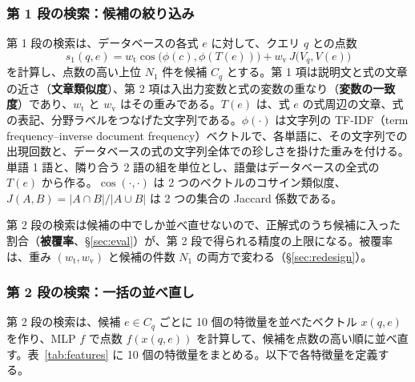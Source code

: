 \documentclass[a4j,dvipdfmx,11pt]{jresume}
\begin{document}
\subsubsection{第 1 段の検索：候補の絞り込み}\label{sec:stage1}
第 1 段の検索は、データベースの各式 $e$ に対して、クエリ $q$ との点数
\begin{equation}
  s_1(q, e) = w_{\mathrm{t}} \cos\bigl(\phi(c), \phi(T(e))\bigr) + w_{\mathrm{v}} \, J\bigl(V_q, V(e)\bigr)
  \label{eq:stage1}
\end{equation}
を計算し、点数の高い上位 $N_1$ 件を候補 $C_q$ とする。第 1 項は説明文と式の文章の近さ（\textbf{文章類似度}）、第 2 項は入出力変数と式の変数の重なり（\textbf{変数の一致度}）であり、$w_{\mathrm{t}}$ と $w_{\mathrm{v}}$ はその重みである。$T(e)$ は、式 $e$ の式周辺の文章、式の表記、分野ラベルをつなげた文字列である。$\phi(\cdot)$ は文字列の TF-IDF（term frequency--inverse document frequency）ベクトルで、各単語に、その文字列での出現回数と、データベースの式の文字列全体での珍しさを掛けた重みを付ける。単語 1 語と、隣り合う 2 語の組を単位とし、語彙はデータベースの全式の $T(e)$ から作る。$\cos(\cdot, \cdot)$ は 2 つのベクトルのコサイン類似度、$J(A, B) = |A \cap B| / |A \cup B|$ は 2 つの集合の Jaccard 係数である。

第 2 段の検索は候補の中でしか並べ直せないので、正解式のうち候補に入った割合（\textbf{被覆率}、\S\ref{sec:eval}）が、第 2 段で得られる精度の上限になる。被覆率は、重み $(w_{\mathrm{t}}, w_{\mathrm{v}})$ と候補の件数 $N_1$ の両方で変わる（\S\ref{sec:redesign}）。

\subsubsection{第 2 段の検索：一括の並べ直し}\label{sec:stage2}
第 2 段の検索は、候補 $e \in C_q$ ごとに 10 個の特徴量を並べたベクトル $x(q, e)$ を作り、MLP $f$ で点数 $f(x(q, e))$ を計算して、候補を点数の高い順に並べ直す。表~\ref{tab:features} に 10 個の特徴量をまとめる。以下で各特徴量を定義する。
\end{document}
